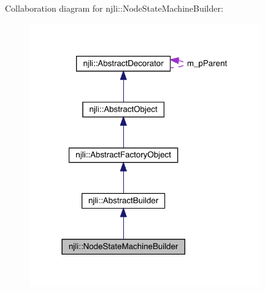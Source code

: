 Collaboration diagram for njli\+:\+:Node\+State\+Machine\+Builder\+:\nopagebreak
\begin{figure}[H]
\begin{center}
\leavevmode
\includegraphics[width=282pt]{classnjli_1_1_node_state_machine_builder__coll__graph}
\end{center}
\end{figure}
